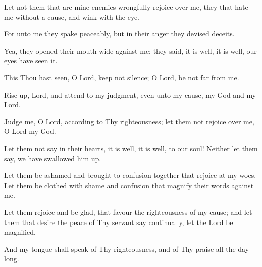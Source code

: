 Let not them that are mine enemies wrongfully rejoice over me, they that hate me without a cause, and wink with the eye.

For unto me they spake peaceably, but in their anger they devised deceits.

Yea, they opened their mouth wide against me; they said, it is well, it is well, our eyes have seen it.

This Thou hast seen, O Lord, keep not silence; O Lord, be not far from me.

Rise up, Lord, and attend to my judgment, even unto my cause, my God and my Lord.

Judge me, O Lord, according to Thy righteousness; let them not rejoice over me, O Lord my God.

Let them not say in their hearts, it is well, it is well, to our soul! Neither let them say, we have swallowed him up.

Let them be ashamed and brought to confusion together that rejoice at my woes. Let them be clothed with shame and confusion that magnify their words against me.

Let them rejoice and be glad, that favour the righteousness of my cause; and let them that desire the peace of Thy servant say continually, let the Lord be magnified.

And my tongue shall speak of Thy righteousness, and of Thy praise all the day long.

